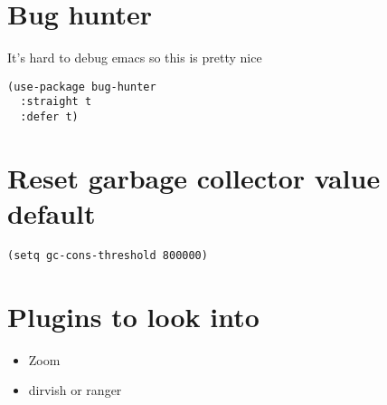 \documentclass[11pt]{article}
\begin{document}
\section{Bug hunter}
\label{sec:org5c1ea8e}
It's hard to debug emacs so this is pretty nice
\begin{verbatim}
(use-package bug-hunter
  :straight t
  :defer t)
\end{verbatim}
\section{Reset garbage collector value default}
\label{sec:org59094b3}
\begin{verbatim}
(setq gc-cons-threshold 800000)
\end{verbatim}
\section{Plugins to look into}
\label{sec:orgc878e0c}
\begin{itemize}
\item Zoom
\item dirvish or ranger
\end{itemize}
\end{document}
